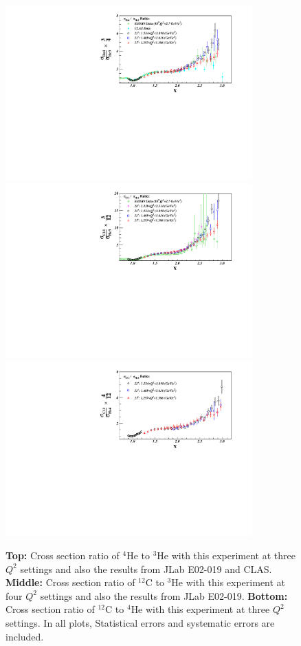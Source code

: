                 \begin{figure}[!ht]
		\begin{center}
		  \includegraphics[width=9.5cm]{./figures/He4_He3_XS_Ratio_June30_L.pdf}
                  \includegraphics[width=9.5cm]{./figures/C12_He3_XS_Ratio_June30_L.pdf}
                  \includegraphics[width=9.5cm]{./figures/C12_He4_XS_Ratio_June30_L.pdf}
		\end{center}
		\vspace*{-5mm}
		\caption{{\bf Top: } Cross section ratio of $^{4}$He to $^{3}$He with this experiment at three $Q^{2}$
                  settings and also the results from JLab E02-019 and CLAS. {\bf Middle: } Cross section ratio of
                  $^{12}$C to $^{3}$He with this experiment at four $Q^{2}$ settings and also the results from JLab
                  E02-019. {\bf Bottom:} Cross section ratio of $^{12}$C to $^{4}$He with this experiment at three
                  $Q^{2}$ settings.
                  In all plots, Statistical errors and systematic errors are included.}
		\label{ratios}
		\end{figure}

